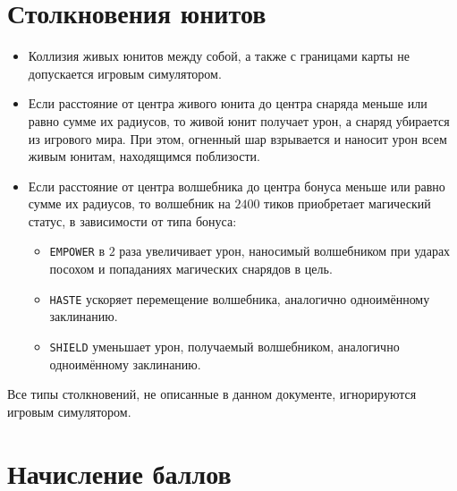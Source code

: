 \section{Столкновения юнитов}

\begin{itemize}
  \item Коллизия живых юнитов между собой, а также с границами карты не допускается игровым симулятором.
  \item Если расстояние от центра живого юнита до центра снаряда меньше или равно сумме их радиусов, то живой юнит получает урон, а снаряд
        убирается из игрового мира. При этом, огненный шар взрывается и наносит урон всем живым юнитам, находящимся поблизости.
  \item Если расстояние от центра волшебника до центра бонуса меньше или равно сумме их радиусов, то волшебник на $2400$ тиков приобретает
        магический статус, в зависимости от типа бонуса:
        \begin{itemize}
            \item \texttt{EMPOWER} в $2$ раза увеличивает урон, наносимый волшебником при ударах посохом и попаданиях магических снарядов
                  в цель.
            \item \texttt{HASTE} ускоряет перемещение волшебника, аналогично одноимённому заклинанию.
            \item \texttt{SHIELD} уменьшает урон, получаемый волшебником, аналогично одноимённому заклинанию.
        \end{itemize}
\end{itemize}

Все типы столкновений, не описанные в данном документе, игнорируются игровым симулятором.

\section{Начисление баллов}

